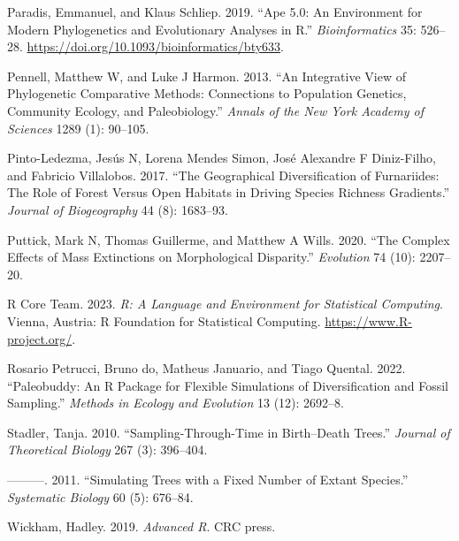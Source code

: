 \documentclass[
]{article}
\newlength{\cslhangindent}
\newenvironment{cslreferences}%
  {\setlength{\parindent}{0pt}%
  \everypar{\setlength{\hangindent}{\cslhangindent}}\ignorespaces}%
  {\par}
\begin{document}
\begin{cslreferences}
\leavevmode\hypertarget{ref-ape}{}%
Paradis, Emmanuel, and Klaus Schliep. 2019. ``Ape 5.0: An Environment
for Modern Phylogenetics and Evolutionary Analyses in R.''
\emph{Bioinformatics} 35: 526--28.
\url{https://doi.org/10.1093/bioinformatics/bty633}.

\leavevmode\hypertarget{ref-pennell2013review}{}%
Pennell, Matthew W, and Luke J Harmon. 2013. ``An Integrative View of
Phylogenetic Comparative Methods: Connections to Population Genetics,
Community Ecology, and Paleobiology.'' \emph{Annals of the New York
Academy of Sciences} 1289 (1): 90--105.

\leavevmode\hypertarget{ref-pinto2017geographical}{}%
Pinto-Ledezma, Jesús N, Lorena Mendes Simon, José Alexandre F
Diniz-Filho, and Fabricio Villalobos. 2017. ``The Geographical
Diversification of Furnariides: The Role of Forest Versus Open Habitats
in Driving Species Richness Gradients.'' \emph{Journal of Biogeography}
44 (8): 1683--93.

\leavevmode\hypertarget{ref-puttick2020complex}{}%
Puttick, Mark N, Thomas Guillerme, and Matthew A Wills. 2020. ``The
Complex Effects of Mass Extinctions on Morphological Disparity.''
\emph{Evolution} 74 (10): 2207--20.

\leavevmode\hypertarget{ref-R}{}%
R Core Team. 2023. \emph{R: A Language and Environment for Statistical
Computing}. Vienna, Austria: R Foundation for Statistical Computing.
\url{https://www.R-project.org/}.

\leavevmode\hypertarget{ref-paleobuddy}{}%
Rosario Petrucci, Bruno do, Matheus Januario, and Tiago Quental. 2022.
``Paleobuddy: An R Package for Flexible Simulations of Diversification
and Fossil Sampling.'' \emph{Methods in Ecology and Evolution} 13 (12):
2692--8.

\leavevmode\hypertarget{ref-stadler2010birthdeath}{}%
Stadler, Tanja. 2010. ``Sampling-Through-Time in Birth--Death Trees.''
\emph{Journal of Theoretical Biology} 267 (3): 396--404.

\leavevmode\hypertarget{ref-treesim}{}%
---------. 2011. ``Simulating Trees with a Fixed Number of Extant
Species.'' \emph{Systematic Biology} 60 (5): 676--84.

\leavevmode\hypertarget{ref-wickham2019advanced}{}%
Wickham, Hadley. 2019. \emph{Advanced R}. CRC press.
\end{cslreferences}
\end{document}
